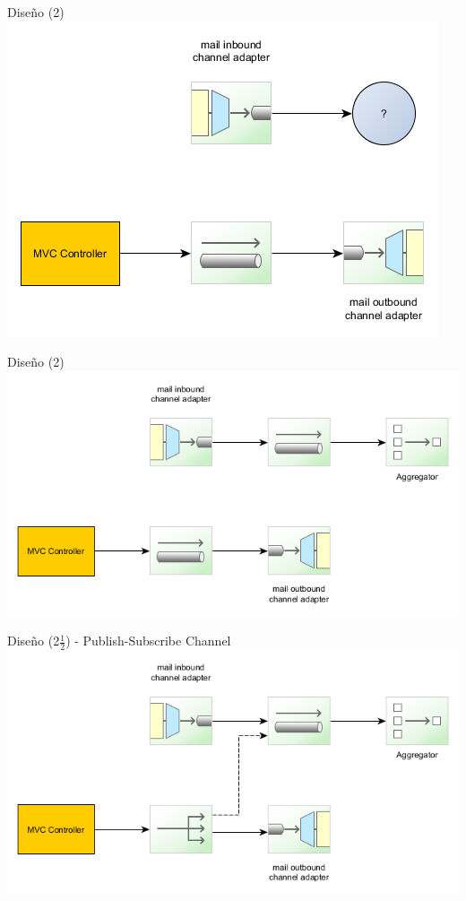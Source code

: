 \documentclass{beamer}
\begin{document}
\begin{frame}{Diseño (2)}
\includegraphics[width=0.9\linewidth]{sp-int-03}
\end{frame}

\begin{frame}{Diseño (2)}
\includegraphics[width=0.9\linewidth]{sp-int-04}
\end{frame}

\begin{frame}{Diseño (2$\frac{1}{2}$) - Publish-Subscribe Channel}
\includegraphics[width=1.0\linewidth]{sp-int-05}
\end{frame}
\end{document}
